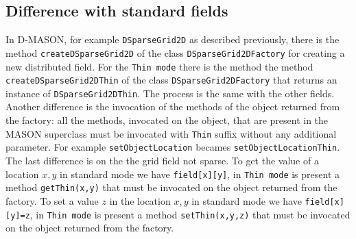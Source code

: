 \documentclass{article}
\begin{document}
\subsection{Difference with standard fields}
In D-MASON, for example \texttt{DSparseGrid2D} as
described previously, there is the method \texttt{createDSparseGrid2D} of the
class \texttt{DSparseGrid2DFactory} for creating a new distributed field. For
the \texttt{Thin mode} there is the method the method
\texttt{createDSparseGrid2DThin} of the class \texttt{DSparseGrid2DFactory}
that returns an instance of \texttt{DSparseGrid2DThin}. The process is the same
with the other fields. Another difference is the invocation of the methods of
the object returned from the factory: all the methods, invocated on the object,
that are present in the MASON superclass must be invocated with \texttt{Thin}
suffix without any additional parameter. For example \texttt{setObjectLocation}
becames \texttt{setObjectLocationThin}. The last difference is on the the grid
field not sparse. To get the value of a location $x,y$ in standard mode we have
\texttt{field[x][y]}, in \texttt{Thin mode} is present a method
\texttt{getThin(x,y)} that must be invocated on the object returned from the
factory. To set a value $z$ in the location $x,y$ in standard mode we have
\texttt{field[x][y]=z}, in \texttt{Thin mode} is present a method
\texttt{setThin(x,y,z)} that must be invocated on the object returned from the
factory.
\end{document}
